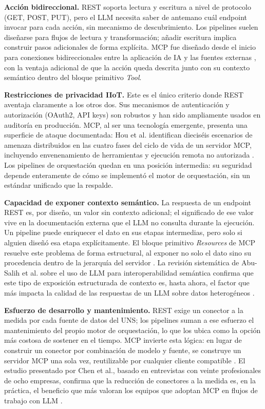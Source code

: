 \textbf{Acción bidireccional.} REST soporta lectura y escritura a nivel de protocolo (GET, POST, PUT), pero el LLM necesita saber de antemano cuál endpoint invocar para cada acción, sin mecanismo de descubrimiento. Los pipelines suelen diseñarse para flujos de lectura y transformación; añadir escritura implica construir pasos adicionales de forma explícita. MCP fue diseñado desde el inicio para conexiones bidireccionales entre la aplicación de IA y las fuentes externas \cite{anthropic2024intro}, con la ventaja adicional de que la acción queda descrita junto con su contexto semántico dentro del bloque primitivo \textit{Tool}.

\textbf{Restricciones de privacidad IIoT.} Este es el único criterio donde REST aventaja claramente a los otros dos. Sus mecanismos de autenticación y autorización (OAuth2, API keys) son robustos y han sido ampliamente usados en auditoría en producción. MCP, al ser una tecnología emergente, presenta una superficie de ataque documentada: Hou et al. identifican dieciséis escenarios de amenaza distribuidos en las cuatro fases del ciclo de vida de un servidor MCP, incluyendo envenenamiento de herramientas y ejecución remota no autorizada \cite{HouMCPLandscape2025}. Los pipelines de orquestación quedan en una posición intermedia: su seguridad depende enteramente de cómo se implementó el motor de orquestación, sin un estándar unificado que la respalde.

\textbf{Capacidad de exponer contexto semántico.} La respuesta de un endpoint REST es, por diseño, un valor sin contexto adicional; el significado de ese valor vive en la documentación externa que el LLM no consulta durante la ejecución. Un pipeline puede enriquecer el dato en sus etapas intermedias, pero solo si alguien diseñó esa etapa explícitamente. El bloque primitivo \textit{Resources} de MCP resuelve este problema de forma estructural, al exponer no solo el dato sino su procedencia dentro de la jerarquía del servidor \cite{anthropic2024arch}. La revisión sistemática de Abu-Salih et al. sobre el uso de LLM para interoperabilidad semántica confirma que este tipo de exposición estructurada de contexto es, hasta ahora, el factor que más impacta la calidad de las respuestas de un LLM sobre datos heterogéneos \cite{AbuSalihSemanticLLM2025}.

\textbf{Esfuerzo de desarrollo y mantenimiento.} REST exige un conector a la medida por cada fuente de datos del UNS; los pipelines suman a ese esfuerzo el mantenimiento del propio motor de orquestación, lo que los ubica como la opción más costosa de sostener en el tiempo. MCP invierte esta lógica: en lugar de construir un conector por combinación de modelo y fuente, se construye un servidor MCP una sola vez, reutilizable por cualquier cliente compatible \cite{AhmadiMCPBridge2025}. El estudio presentado por Chen et al., basado en entrevistas con veinte profesionales de ocho empresas, confirma que la reducción de conectores a la medida es, en la práctica, el beneficio que más valoran los equipos que adoptan MCP en flujos de trabajo con LLM \cite{ChenEnterpriseMCP2026}.

